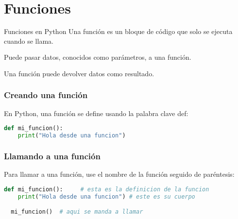 
\section{Funciones}

\begin{frame}[c]{Funciones en Python}
  \vspace{\baselineskip}
  Una función es un bloque de código que solo se ejecuta cuando se llama.

  \vspace{\baselineskip}
  Puede pasar datos, conocidos como parámetros, a una función.

  \vspace{\baselineskip}
  Una función puede devolver datos como resultado. 
\end{frame}

\begin{frame}[fragile]
  \frametitle{Creando una función}

  En Python, una función se define usando la palabra clave
  \textcolor{codeKeyword}{def}:

  \vspace{\baselineskip}
  \begin{lstlisting}[language=Python]
  def mi_funcion():
    print("Hola desde una funcion")
  \end{lstlisting}
\end{frame}

\begin{frame}[fragile]
  \frametitle{Llamando a una función}

  Para llamar a una función, use el nombre de la función
  seguido de paréntesis: 

  \vspace{\baselineskip}
  \begin{lstlisting}[language=Python]
  def mi_funcion():     # esta es la definicion de la funcion
    print("Hola desde una funcion") # este es su cuerpo

  mi_funcion()  # aqui se manda a llamar
  \end{lstlisting}
\end{frame}

